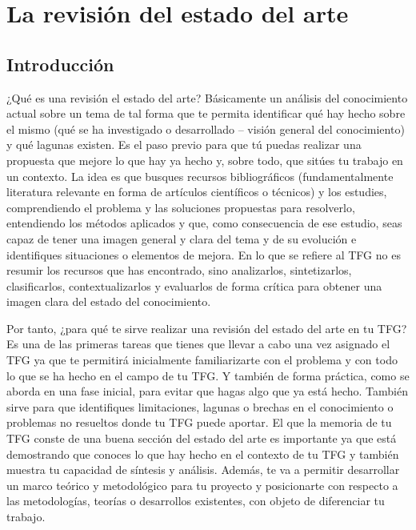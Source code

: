 \chapter{La revisión del estado del arte} \label{cap:RevisionEstadoDelArte}


\section{Introducción}
¿Qué es una revisión el estado del arte? Básicamente un análisis del conocimiento actual sobre un tema de tal forma que te permita identificar qué hay hecho sobre el mismo (qué se ha investigado o desarrollado -- visión general del conocimiento) y qué lagunas existen. Es el paso previo para que tú puedas realizar una propuesta que mejore lo que hay ya hecho y, sobre todo, que sitúes tu trabajo en un contexto. La idea es que busques recursos bibliográficos (fundamentalmente literatura relevante en forma de artículos científicos o técnicos) y los estudies, comprendiendo el problema y las soluciones propuestas para resolverlo, entendiendo los métodos aplicados y que, como consecuencia de ese estudio, seas capaz de tener una imagen general y clara del tema y de su evolución e identifiques situaciones o elementos de mejora. En lo que se refiere al TFG no es resumir los recursos que has encontrado, sino analizarlos, sintetizarlos, clasificarlos, contextualizarlos y evaluarlos de forma crítica para obtener una imagen clara del estado del conocimiento.

Por tanto, ¿para qué te sirve realizar una revisión del estado del arte en tu TFG? Es una de las primeras tareas que tienes que llevar a cabo una vez asignado el TFG ya que te permitirá inicialmente familiarizarte con el problema y con todo lo que se ha hecho en el campo de tu TFG. Y también de forma práctica, como se aborda en una fase inicial, para evitar que hagas algo que ya está hecho. También sirve para que identifiques limitaciones, lagunas o brechas en el conocimiento o problemas no resueltos donde tu TFG puede aportar. El que la memoria de tu TFG conste de una buena sección del estado del arte es importante ya que está demostrando que conoces lo que hay hecho en el contexto de tu TFG y también muestra tu capacidad de síntesis y análisis. Además, te va a permitir desarrollar un marco teórico y metodológico para tu proyecto y posicionarte con respecto a las metodologías, teorías o desarrollos existentes, con objeto de diferenciar tu trabajo. 

